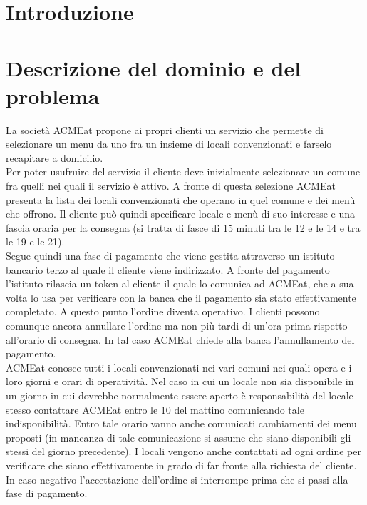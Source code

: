 \documentclass[11pt]{article} %
\begin{document}
\clearpage
\tableofcontents
\thispagestyle{empty}
\newpage

\section{Introduzione}

\clearpage

\section{Descrizione del dominio e del problema}
\label{intro}
La società ACMEat propone ai propri clienti un servizio che permette di selezionare un menu da uno fra un insieme di locali convenzionati e farselo recapitare a domicilio.\\
Per poter usufruire del servizio il cliente deve inizialmente selezionare un comune fra quelli nei quali il servizio è attivo. A fronte di questa selezione ACMEat presenta la lista dei locali convenzionati che operano in quel comune e dei menù che offrono. Il cliente può quindi specificare locale e menù di suo interesse e una fascia oraria per la consegna (si tratta di fasce di 15 minuti tra le 12 e le 14 e tra le 19 e le 21).\\
Segue quindi una fase di pagamento che viene gestita attraverso un istituto bancario terzo al quale il cliente viene indirizzato. A fronte del pagamento l’istituto rilascia un token al cliente il quale lo comunica ad ACMEat, che a sua volta lo usa per verificare con la banca che il pagamento sia stato effettivamente completato. A questo punto l’ordine diventa operativo. I clienti possono comunque ancora annullare l’ordine ma non più tardi di un’ora prima rispetto all’orario di consegna. In tal caso ACMEat chiede alla banca l’annullamento del pagamento.\\
ACMEat conosce tutti i locali convenzionati nei vari comuni nei quali opera e i loro giorni e orari di operatività. Nel caso in cui un locale non sia disponibile in un giorno in cui dovrebbe normalmente essere aperto è responsabilità del locale stesso contattare ACMEat entro le 10 del mattino comunicando tale indisponibilità. Entro tale orario vanno anche comunicati cambiamenti dei menu proposti (in mancanza di tale comunicazione si assume che siano disponibili gli stessi del giorno precedente). I locali vengono anche contattati ad ogni ordine per verificare che siano effettivamente in grado di far fronte alla richiesta del cliente. In caso negativo l’accettazione dell’ordine si interrompe prima che si passi alla fase di pagamento.\\
\end{document}
